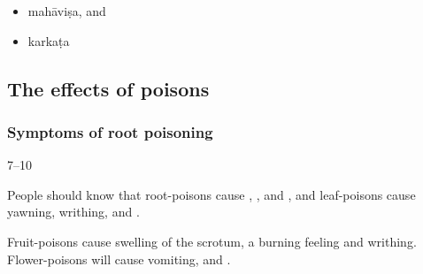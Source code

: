 \begin{translation}
\begin{itemize}
\item \gls{mahāviṣa},
and 
\item \gls{karkaṭa}
            \end{itemize}


    
\subsection{The effects of poisons}

\subsubsection{Symptoms of root poisoning}
    \item[7--10]
    
People should know that root-poisons cause ,
, and , and  leaf-poisons
cause yawning, writhing, and .
    
 Fruit-poisons cause swelling of the
   scrotum, a burning feeling and writhing.  Flower-poisons will
    cause vomiting,  and .  
    

\end{translation}
